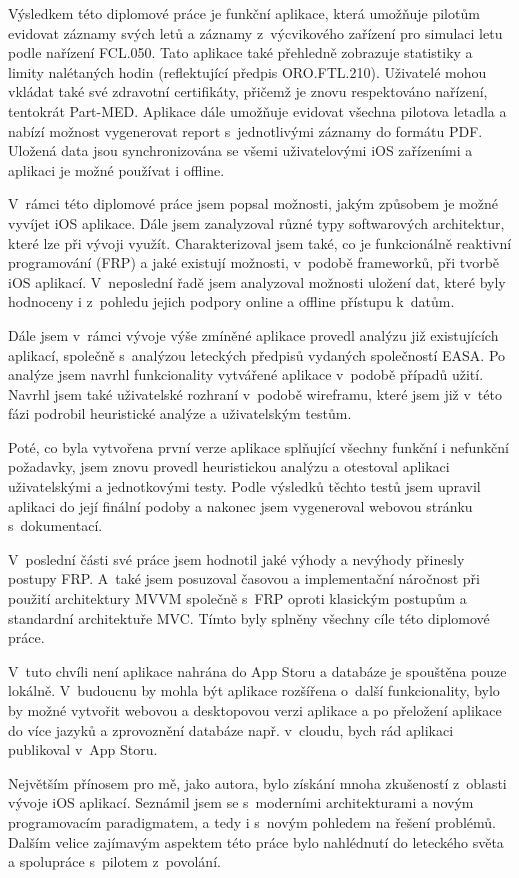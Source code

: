 \documentclass[thesis=M,czech]{FITthesis}[2012/06/26]
\begin{document}
\begin{conclusion}
Výsledkem této diplomové práce je funkční aplikace, která umožňuje pilotům evidovat záznamy svých letů a záznamy z~výcvikového zařízení pro simulaci letu podle nařízení FCL.050. Tato aplikace také přehledně zobrazuje statistiky a limity nalétaných hodin (reflektující předpis ORO.FTL.210). Uživatelé mohou vkládat také své zdravotní certifikáty, přičemž je znovu respektováno nařízení, tentokrát Part-MED. Aplikace dále umožňuje evidovat všechna pilotova letadla a nabízí možnost vygenerovat report s~jednotlivými záznamy do formátu PDF. Uložená data jsou synchronizována se všemi uživatelovými iOS zařízeními a aplikaci je možné používat i offline.

V~rámci této diplomové práce jsem popsal možnosti, jakým způsobem je možné vyvíjet iOS aplikace. Dále jsem zanalyzoval různé typy softwarových architektur, které lze při vývoji využít. Charakterizoval jsem také, co je funkcionálně reaktivní programování (FRP) a jaké existují možnosti, v~podobě frameworků, při tvorbě iOS aplikací. V~neposlední řadě jsem analyzoval možnosti uložení dat, které byly hodnoceny i z~pohledu jejich podpory online a offline přístupu k~datům. 

Dále jsem v~rámci vývoje výše zmíněné aplikace provedl analýzu již existujících aplikací, společně s~analýzou leteckých předpisů vydaných společností EASA. Po analýze jsem navrhl funkcionality vytvářené aplikace v~podobě případů užití. Navrhl jsem také uživatelské rozhraní v~podobě wireframu, které jsem již v~této fázi podrobil heuristické analýze a uživatelským testům.

Poté, co byla vytvořena první verze aplikace splňující všechny funkční i nefunkční požadavky, jsem znovu provedl heuristickou analýzu a otestoval aplikaci uživatelskými a jednotkovými testy. Podle výsledků těchto testů jsem upravil aplikaci do její finální podoby a nakonec jsem vygeneroval webovou stránku s~dokumentací.

V~poslední části své práce jsem hodnotil jaké výhody a nevýhody přinesly postupy FRP. A~také jsem posuzoval časovou a implementační náročnost při použití architektury MVVM společně s~FRP oproti klasickým postupům a standardní architektuře MVC. Tímto byly splněny všechny cíle této diplomové práce.

V~tuto chvíli není aplikace nahrána do App Storu a databáze je spouštěna pouze lokálně. V~budoucnu by mohla být aplikace rozšířena o~další funkcionality, bylo by možné vytvořit webovou a desktopovou verzi aplikace a po přeložení aplikace do více jazyků a zprovoznění databáze např. v~cloudu, bych rád aplikaci publikoval v~App Storu.

Největším přínosem pro mě, jako autora, bylo získání mnoha zkušeností z~oblasti vývoje iOS aplikací. Seznámil jsem se s~moderními architekturami a novým programovacím paradigmatem, a tedy i s~novým pohledem na řešení problémů.  Dalším velice zajímavým aspektem této práce bylo nahlédnutí do leteckého světa a spolupráce s~pilotem z~povolání.

\end{conclusion}
\end{document}
